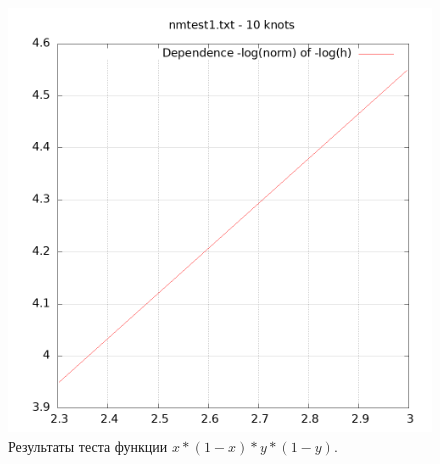 \documentclass[14pt,a4paper]{extarticle}
\newcommand{\1}{\mathbbm{1}}
\begin{document}
\begin{figure}
    \centering
    \includegraphics[scale=0.5]{Images/nmtest1.txt.png}
    \caption{Результаты теста функции $x * (1 - x) * y * (1 - y)$.}
\end{figure}
\end{document}
